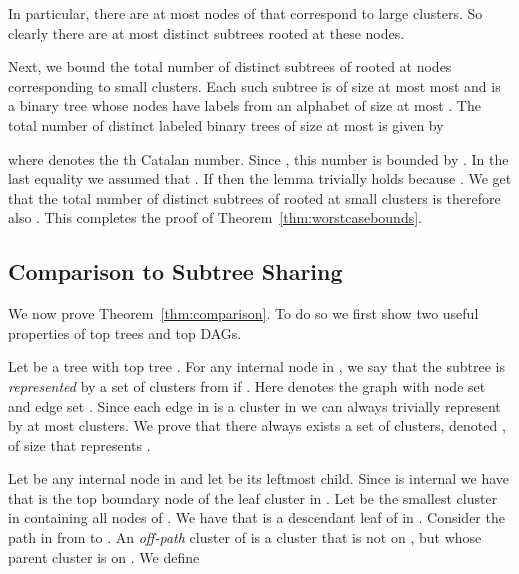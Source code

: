 \documentclass [11pt]{article}
\begin{document}
In particular, there are at most  nodes of  that correspond to large clusters. So clearly there are at most  distinct subtrees rooted at these nodes. 

Next, we bound the total number of distinct subtrees of  rooted at nodes  corresponding to small clusters.  Each such subtree is of size at most  
most  and is a binary tree whose nodes have labels from an alphabet of size at most . 
The total number of distinct labeled binary trees of size at most   is given by 

where  denotes the th Catalan number. Since , this number is bounded by 
. In the last equality we assumed that . If  then the lemma trivially holds because .
We get that the total number of distinct subtrees of   rooted at small clusters is therefore  also .
This completes the proof of Theorem~\ref{thm:worstcasebounds}. 






\subsection{Comparison to Subtree Sharing}\label{sec:comparisonsubtreesharing}
We now prove Theorem~\ref{thm:comparison}. To do so we first show two useful properties of top trees and top DAGs. 

Let  be a tree with top tree . For any internal node  in , we say that the subtree  is \emph{represented} by a set of clusters  from  if . Here  denotes the graph with node set  and  edge set . Since each edge in  is a cluster in  we can always trivially represent  by at most  clusters. We prove that there always exists a set of clusters, denoted , of size  that represents . 

Let  be any internal node in  and let  be its  leftmost child. Since  is internal we have that  is the top boundary node of the leaf cluster  in . Let  be the smallest cluster in  containing all nodes of . We have that  is a descendant leaf of  in . Consider the path  in  from  to . An \emph{off-path}  cluster of  is a cluster  that is not on , but whose parent cluster is on . We define 
\end{document}
